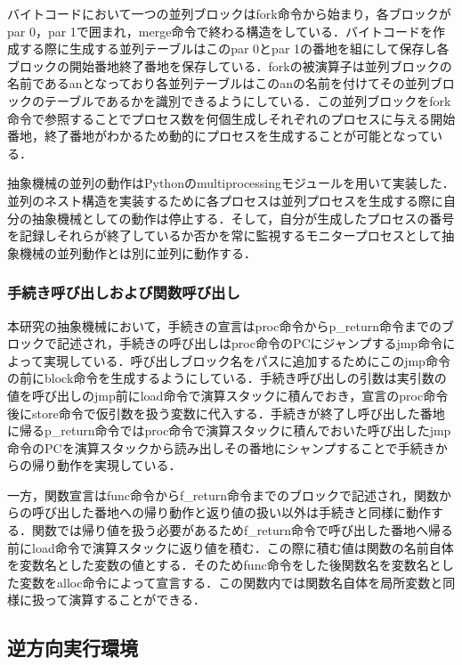 \documentclass[submit,PRO]{ipsj}
\begin{document}
バイトコードにおいて一つの並列ブロックはfork命令から始まり，各ブロックがpar 0，par 1で囲まれ，merge命令で終わる構造をしている．バイトコードを作成する際に生成する並列テーブルはこのpar 0とpar 1の番地を組にして保存し各ブロックの開始番地終了番地を保存している．forkの被演算子は並列ブロックの名前であるanとなっており各並列テーブルはこのanの名前を付けてその並列ブロックのテーブルであるかを識別できるようにしている．この並列ブロックをfork命令で参照することでプロセス数を何個生成しそれぞれのプロセスに与える開始番地，終了番地がわかるため動的にプロセスを生成することが可能となっている．

抽象機械の並列の動作はPythonのmultiprocessingモジュールを用いて実装した．並列のネスト構造を実装するために各プロセスは並列プロセスを生成する際に自分の抽象機械としての動作は停止する．そして，自分が生成したプロセスの番号を記録しそれらが終了しているか否かを常に監視するモニタープロセスとして抽象機械の並列動作とは別に並列に動作する．


\subsubsection{手続き呼び出しおよび関数呼び出し}

本研究の抽象機械において，手続きの宣言はproc命令からp\_return命令までのブロックで記述され，手続きの呼び出しはproc命令のPCにジャンプするjmp命令によって実現している．呼び出しブロック名をパスに追加するためにこのjmp命令の前にblock命令を生成するようにしている．手続き呼び出しの引数は実引数の値を呼び出しのjmp前にload命令で演算スタックに積んでおき，宣言のproc命令後にstore命令で仮引数を扱う変数に代入する．手続きが終了し呼び出した番地に帰るp\_return命令ではproc命令で演算スタックに積んでおいた呼び出したjmp命令のPCを演算スタックから読み出しその番地にシャンプすることで手続きからの帰り動作を実現している．

一方，関数宣言はfunc命令からf\_return命令までのブロックで記述され，関数からの呼び出した番地への帰り動作と返り値の扱い以外は手続きと同様に動作する．関数では帰り値を扱う必要があるためf\_return命令で呼び出した番地へ帰る前にload命令で演算スタックに返り値を積む．この際に積む値は関数の名前自体を変数名とした変数の値とする．そのためfunc命令をした後関数名を変数名とした変数をalloc命令によって宣言する．この関数内では関数名自体を局所変数と同様に扱って演算することができる．



\subsection{逆方向実行環境}
\label{sec:4.2}
\end{document}
